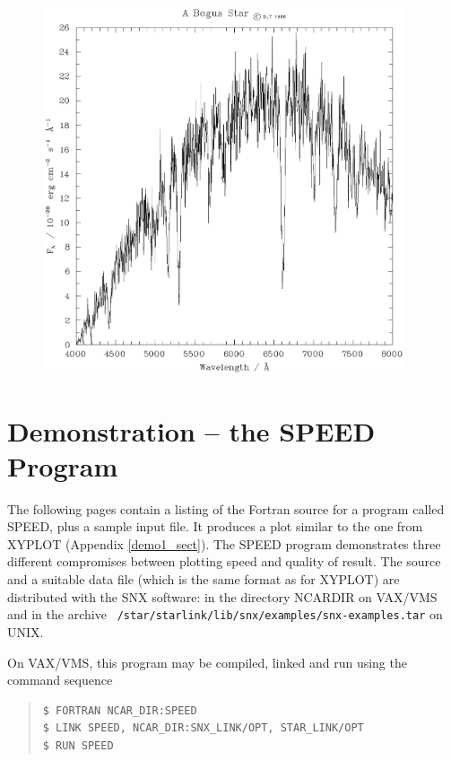\documentclass[twoside,11pt]{article}
\renewcommand{\_}{\texttt{\symbol{95}}}
\begin{document}
\begin{figure}
\includegraphics[width=0.95\textwidth]{sun90-fig-1}
\end{figure}

\section {Demonstration -- the SPEED Program} \label{demo2_sect}

The following pages contain a listing of the Fortran source for a
program called SPEED, plus a sample input file.  It produces a plot
similar to the one from XYPLOT (Appendix \ref{demo1_sect}).  The SPEED
program demonstrates three different compromises between plotting speed
and quality of result.  The source and a suitable data file (which is
the same format as for XYPLOT) are distributed with the SNX software:
in the directory NCAR\_DIR on VAX/VMS and in the archive {\tt
/star/\-starlink/\-lib/\-snx/examples/snx-examples.tar} on UNIX.

On VAX/VMS, this program may be compiled, linked and run using the command
sequence

\begin {quote}
\begin{verbatim}
$ FORTRAN NCAR_DIR:SPEED
$ LINK SPEED, NCAR_DIR:SNX_LINK/OPT, STAR_LINK/OPT
$ RUN SPEED
\end{verbatim}
\end {quote}
\end{document}
